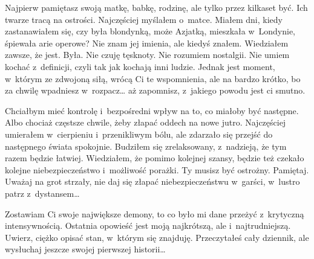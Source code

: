 Najpierw pamiętasz swoją matkę, babkę, rodzinę, ale tylko przez kilkaset być. Ich twarze tracą na ostrości. Najczęściej myślałem o~matce. Miałem dni, kiedy zastanawiałem się, czy była blondynką, może Azjatką, mieszkała w~Londynie, śpiewała arie operowe? Nie znam jej imienia, ale kiedyś znałem. Wiedziałem zawsze, że jest. Była. Nie czuję tęsknoty. Nie rozumiem nostalgii. Nie umiem kochać z~definicji, czyli tak jak kochają inni ludzie. Jednak jest moment, w~którym ze zdwojoną siłą, wrócą Ci te wspomnienia, ale na bardzo krótko, bo za chwilę wpadniesz w~rozpacz… aż zapomnisz, z~jakiego powodu jest ci smutno.

Chciałbym mieć kontrolę i~bezpośredni wpływ na to, co miałoby być następne. Albo chociaż częstsze chwile, żeby złapać oddech na nowe jutro. Najczęściej umierałem w~cierpieniu i~przenikliwym bólu, ale zdarzało się przejść do następnego świata spokojnie. Budziłem się zrelaksowany, z~nadzieją, że tym razem będzie łatwiej. Wiedziałem, że pomimo kolejnej szansy, będzie też czekało kolejne niebezpieczeństwo i~możliwość porażki. Ty musisz być ostrożny. Pamiętaj. Uważaj na grot strzały, nie daj się złapać niebezpieczeństwu w~garści, w~lustro patrz z~dystansem…

Zostawiam Ci swoje największe demony, to co było mi dane przeżyć z~krytyczną intensywnością. Ostatnia opowieść jest moją najkrótszą, ale i~najtrudniejszą. Uwierz, ciężko opisać stan, w~którym się znajduję. Przeczytałeś cały dziennik, ale wysłuchaj jeszcze swojej pierwszej historii…

\paraSep

